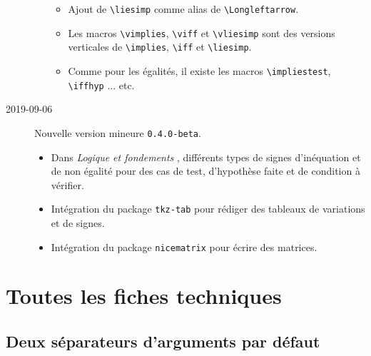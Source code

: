 \documentclass[12pt,a4paper]{article}
\newcommand\env[1]{\texttt{#1}}
\newcommand\macro[1]{\env{\textbackslash{}#1}}
\theoremstyle{definition}
\begin{document}
\begin{description}
\begin{itemize}[itemsep=.5em]
\begin{itemize}[itemsep=.5em]
            \item Ajout de \macro{liesimp} comme alias de \macro{Longleftarrow}.
    
            \item Les macros \macro{vimplies}, \macro{viff} et \macro{vliesimp} sont des versions verticales de \macro{implies}, \macro{iff} et \macro{liesimp}.
    
            \item Comme pour les égalités, il existe les macros \macro{impliestest}, \macro{iffhyp} ... etc.
        \end{itemize}
    \end{itemize}


    \medskip
    \item[2019-09-06] Nouvelle version mineure \verb+0.4.0-beta+.
    
    \begin{itemize}[itemsep=.5em]
        \item Dans \emph{\og Logique et fondements \fg}, différents types de signes d'inéquation et de non égalité pour des cas de test, d'hypothèse faite et de condition à vérifier.
    
    
        \item Intégration du package \verb+tkz-tab+ pour rédiger des tableaux de variations et de signes.
    
    
        \item Intégration du package \verb+nicematrix+ pour écrire des matrices.
    \end{itemize}


\end{description}


\newpage
\section{Toutes les fiches techniques} \label{techincal-ids}


\subsection{Deux séparateurs d'arguments par défaut}

\end{document}
